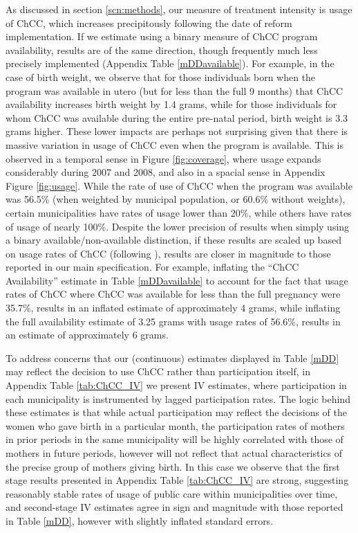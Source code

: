 \documentclass[12pt]{article}
\begin{document}
\begin{spacing}{1.4}
As discussed in section \ref{scn:methods}, our measure of treatment
intensity is usage of ChCC, which increases precipitously following the date of
reform implementation.  If we estimate using a binary measure of
ChCC program availability, results are of the same direction, though
frequently much less precisely implemented (Appendix Table
\ref{mDDavailable}).  For example, in the case of birth weight,
we observe that for those individuals born when the program was
available in utero (but for less than the full 9 months) that ChCC
availability increases birth weight by 1.4 grams, while for those
individuals for whom ChCC was available during the entire pre-natal
period, birth weight is 3.3 grams higher.  These lower impacts are
perhaps not surprising given that there is massive variation in usage
of ChCC even when the program is available.  This is observed in a 
temporal sense in Figure \ref{fig:coverage}, where usage expands
considerably during 2007 and 2008, and also in a spacial sense in Appendix
Figure \ref{fig:usage}.  While the rate of use of ChCC when the
program was available was 56.5\% (when weighted by municipal population,
or 60.6\% without weights), certain municipalities have rates of
usage lower than 20\%, while others have rates of usage of nearly
100\%.  Despite the lower precision of results when simply using
a binary available/non-available distinction, if these results are
scaled up based on usage rates of ChCC (following \citet{Almondetal2011}),
results are closer in magnitude to those reported in our main
specification. For example, inflating the ``ChCC Availability'' estimate
in Table \ref{mDDavailable} to account for the fact that usage rates
of ChCC where ChCC was available for less than the full pregnancy
were 35.7\%, results in an inflated estimate of approximately 4 grams,
while inflating the full availability estimate of 3.25 grams with
usage rates of 56.6\%, results in an estimate of approximately 6
grams.

To address concerns that our (continuous) estimates displayed in
Table \ref{mDD} may reflect the
decision to use ChCC rather than participation itself, in Appendix
Table \ref{tab:ChCC_IV} we present IV estimates, where participation
in each municipality is instrumented by lagged participation rates.
The logic behind these estimates is that while actual participation
may reflect the decisions of the women who gave birth in a particular
month, the participation rates of mothers in prior periods in the
same municipality will be highly correlated with those of mothers
in future periods, however will not reflect that actual characteristics
of the precise group of mothers giving birth.  In this case we observe
that the first stage results presented in Appendix Table \ref{tab:ChCC_IV}
are strong, suggesting reasonably stable rates of usage of public care
within municipalities over time, and second-stage IV estimates agree
in sign and magnitude with those reported in Table \ref{mDD}, however with
slightly inflated standard errors.


\end{spacing}
\end{document}
